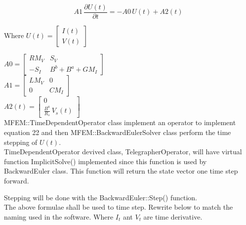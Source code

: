 \documentclass[12pt, letterpaper]{article}
\begin{document}
\begin{equation}
	A1\, \frac{\partial U(t)}{\partial t} = - A0\, U(t) + A2(t)
\end{equation}

Where $U(t) = 	\begin{bmatrix}
	I(t) \\
	V(t)
\end{bmatrix} $

$A0 = \begin{bmatrix}
   R M_V & S_V	\\
	- S_I & B^b + B^a + G M_I
\end{bmatrix} $\\

$A1 = \begin{bmatrix}
	L M_V & 0 \\
	0 & C M_I
\end{bmatrix} $\\

$A2(t) = \begin{bmatrix}
	0\\
	 \frac{B^a}{R_s}\, V_s(t)
\end{bmatrix} $\\


MFEM::TimeDependentOperator class implement an operator to implement equation 22 and then MFEM::BackwardEulerSolver class perform the time stepping of $U(t)$.\\

TimeDependentOperator devived class, TelegrapherOperator, will have virtual function ImplicitSolve() implemented since this function is used by BackwardEuler class. This function will return the state vector one time step forward.

Stepping will be done with the BackwardEuler::Step() function.\\








The above formulae shall be used to time step. Rewrite below to match the naming used in the software. Where $I_t$ ant $V_t$ are time derivative.
\end{document}
